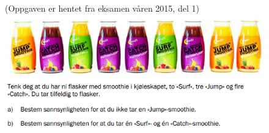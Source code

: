 \nes 
{}
\begin{figure}
	(Oppgaven er hentet fra eksamen våren 2015, del 1)\\
	\includegraphics[scale=0.6]{v15_d1_6}
\end{figure}



